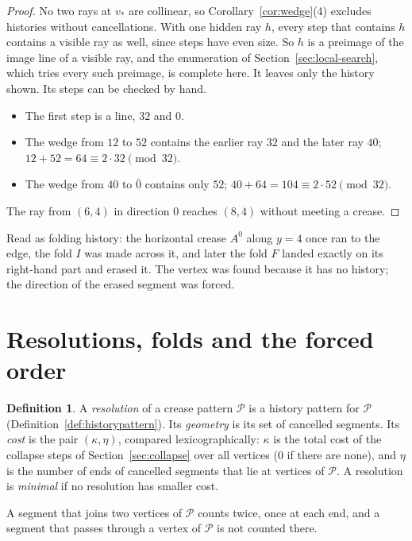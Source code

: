 \documentclass[11pt]{article}
\theoremstyle{definition}
\newtheorem{definition}[theorem]{Definition}
\theoremstyle{remark}
\newcommand{\vstar}{v_\ast}
\newcommand{\hid}[1]{\bar{#1}}
\begin{document}
\begin{proof}
No two rays at $\vstar$ are collinear, so Corollary~\ref{cor:wedge}(4) excludes histories without cancellations. With one hidden ray $h$, every step that contains $h$ contains a visible ray as well, since steps have even size. So $h$ is a preimage of the image line of a visible ray, and the enumeration of Section~\ref{sec:local-search}, which tries every such preimage, is complete here. It leaves only the history shown. Its steps can be checked by hand.
\begin{itemize}
\item The first step is a line, $32$ and $0$.
\item The wedge from $12$ to $52$ contains the earlier ray $32$ and the later ray $40$; $12+52=64\equiv2\cdot32\pmod{32}$.
\item The wedge from $40$ to $\hid0$ contains only $52$; $40+64=104\equiv2\cdot52\pmod{32}$.
\end{itemize}
The ray from $(6,4)$ in direction $0$ reaches $(8,4)$ without meeting a crease.
\end{proof}

Read as folding history: the horizontal crease $A^0$ along $y=4$ once ran to the edge, the fold $I$ was made across it, and later the fold $F$ landed exactly on its right-hand part and erased it. The vertex was found because it has no history; the direction of the erased segment was forced.

\section{Resolutions, folds and the forced order}\label{sec:global}

\begin{definition}\label{def:resolution}
A \emph{resolution} of a crease pattern $\mathcal P$ is a history pattern for $\mathcal P$ (Definition~\ref{def:historypattern}). Its \emph{geometry} is its set of cancelled segments. Its \emph{cost} is the pair $(\kappa,\eta)$, compared lexicographically: $\kappa$ is the total cost of the collapse steps of Section~\ref{sec:collapse} over all vertices ($0$ if there are none), and $\eta$ is the number of ends of cancelled segments that lie at vertices of $\mathcal P$. A resolution is \emph{minimal} if no resolution has smaller cost.
\end{definition}

A segment that joins two vertices of $\mathcal P$ counts twice, once at each end, and a segment that passes through a vertex of $\mathcal P$ is not counted there.
\end{document}

